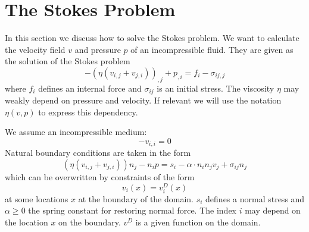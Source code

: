 
%
%
%

\section{The Stokes Problem}
\label{STOKES PROBLEM} 
In this section we discuss how to solve the Stokes problem.
We want to calculate the velocity field $v$ and pressure $p$
of an incompressible fluid.
They are given as the solution of the Stokes problem
\begin{equation}\label{Stokes 1}
-\left(\eta(v_{i,j}+ v_{j,i})\right)_{,j}+p_{,i}=f_{i}-\sigma_{ij,j}
\end{equation}
where  $f_{i}$ defines an internal force and
$\sigma_{ij}$ is an initial stress.
The viscosity $\eta$ may weakly depend on pressure and velocity.
If relevant we will use the notation $\eta(v,p)$ to express this dependency.

We assume an incompressible medium:
\begin{equation}\label{Stokes 2}
-v_{i,i}=0
\end{equation}
Natural boundary conditions are taken in the form 
\begin{equation}\label{Stokes Boundary}
\left(\eta(v_{i,j}+ v_{j,i})\right)n_{j}-n_{i}p=s_{i} - \alpha \cdot n_{i} n_{j} v_{j}+\sigma_{ij} n_{j}
\end{equation}
which can be overwritten by constraints of the form 
\begin{equation}\label{Stokes Boundary0}
v_{i}(x)=v^D_{i}(x)
\end{equation}
at some locations $x$ at the boundary of the domain.
$s_{i}$ defines a normal stress and $\alpha\ge 0$ the spring constant for
restoring normal force.
The index $i$ may depend on the location $x$ on the boundary.
$v^D$ is a given function on the domain.

